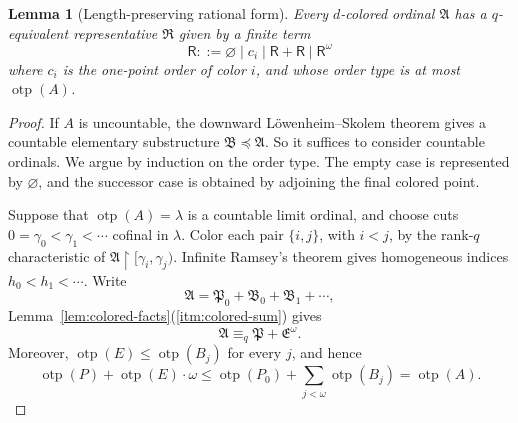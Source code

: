 \documentclass{amsart}
\newtheorem{lemma}{Lemma}
\theoremstyle{definition}
\begin{document}
\begin{lemma}[Length-preserving rational form]\label{lem:rational-form}
    Every $d$-colored ordinal $\mathfrak A$ has a $q$-equivalent representative $\mathfrak R$ given by a finite term
    $$\mathsf R::=\varnothing\mid c_i\mid\mathsf R+\mathsf R\mid \mathsf R^\omega$$
    where $c_i$ is the one-point order of color $i$, and whose order type is at most $\operatorname{otp}(A)$.
\end{lemma}
\begin{proof}
If $A$ is uncountable, the downward L\"owenheim--Skolem theorem gives a countable elementary substructure $\mathfrak B\preccurlyeq\mathfrak A$. So it suffices to consider countable ordinals. We argue by induction on the order type. The empty case is represented by $\varnothing$, and the successor case is obtained by adjoining the final colored point.

Suppose that $\operatorname{otp}(A)=\lambda$ is a countable limit ordinal, and choose cuts $0=\gamma_0<\gamma_1<\cdots$ cofinal in $\lambda$. Color each pair $\{i,j\}$, with $i<j$, by the rank-$q$ characteristic of $\mathfrak A\mathbin{\upharpoonright}[\gamma_i,\gamma_j)$. Infinite Ramsey's theorem gives homogeneous indices $h_0<h_1<\cdots$. Write
\[
\mathfrak A=\mathfrak P_0+\mathfrak B_0+\mathfrak B_1+\cdots,
\]
 Lemma~\ref{lem:colored-facts}(\ref{itm:colored-sum}) gives
\[
\mathfrak A\equiv_q\mathfrak P+\mathfrak E^\omega.
\]
Moreover, $\operatorname{otp}(E)\leq\operatorname{otp}(B_j)$ for every $j$, and hence
$$
\operatorname{otp}(P)+\operatorname{otp}(E)\cdot\omega
\leq\operatorname{otp}(P_0)+\sum_{j<\omega}\operatorname{otp}(B_j)
=\operatorname{otp}(A).
$$
\end{proof}
\end{document}

